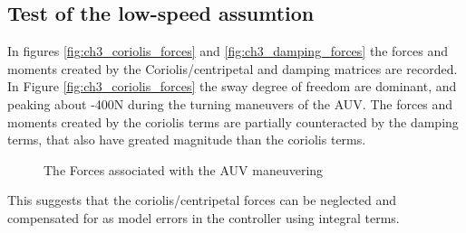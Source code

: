	\subsection{Test of the low-speed assumtion}
		In figures \ref{fig:ch3_coriolis_forces} and \ref{fig:ch3_damping_forces} the forces and
		moments created by the Coriolis/centripetal and damping matrices are recorded. In Figure
		\ref{fig:ch3_coriolis_forces} the sway degree of freedom are dominant, and peaking about
		-400N during the turning maneuvers of the AUV. The forces and moments created by the coriolis
		terms are partially counteracted by the damping terms, that also have greated magnitude than
		the coriolis terms.
		\begin{figure}[htbp]
			\centering
			\caption{The Forces associated with the AUV maneuvering}
			\label{fig:ch3-maneuvering forces}
		\end{figure}
		This suggests that the coriolis/centripetal forces can be neglected and compensated for as
		model errors in the controller using integral terms.  

